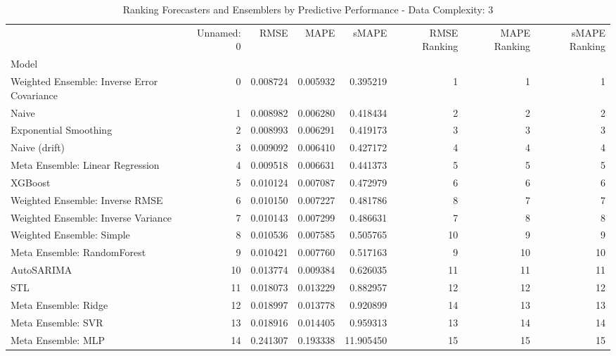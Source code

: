 \begin{table}
\caption{Ranking Forecasters and Ensemblers by Predictive Performance - Data Complexity: 3}
\begin{tabular}{lrrrrrrr}
\toprule
 & Unnamed: 0 & RMSE & MAPE & sMAPE & RMSE Ranking & MAPE Ranking & sMAPE Ranking \\
Model &  &  &  &  &  &  &  \\
\midrule
Weighted Ensemble: Inverse Error Covariance & 0 & 0.008724 & 0.005932 & 0.395219 & 1 & 1 & 1 \\
Naive & 1 & 0.008982 & 0.006280 & 0.418434 & 2 & 2 & 2 \\
Exponential Smoothing & 2 & 0.008993 & 0.006291 & 0.419173 & 3 & 3 & 3 \\
Naive (drift) & 3 & 0.009092 & 0.006410 & 0.427172 & 4 & 4 & 4 \\
Meta Ensemble: Linear Regression & 4 & 0.009518 & 0.006631 & 0.441373 & 5 & 5 & 5 \\
XGBoost & 5 & 0.010124 & 0.007087 & 0.472979 & 6 & 6 & 6 \\
Weighted Ensemble: Inverse RMSE & 6 & 0.010150 & 0.007227 & 0.481786 & 8 & 7 & 7 \\
Weighted Ensemble: Inverse Variance & 7 & 0.010143 & 0.007299 & 0.486631 & 7 & 8 & 8 \\
Weighted Ensemble: Simple & 8 & 0.010536 & 0.007585 & 0.505765 & 10 & 9 & 9 \\
Meta Ensemble: RandomForest & 9 & 0.010421 & 0.007760 & 0.517163 & 9 & 10 & 10 \\
AutoSARIMA & 10 & 0.013774 & 0.009384 & 0.626035 & 11 & 11 & 11 \\
STL & 11 & 0.018073 & 0.013229 & 0.882957 & 12 & 12 & 12 \\
Meta Ensemble: Ridge & 12 & 0.018997 & 0.013778 & 0.920899 & 14 & 13 & 13 \\
Meta Ensemble: SVR & 13 & 0.018916 & 0.014405 & 0.959313 & 13 & 14 & 14 \\
Meta Ensemble: MLP & 14 & 0.241307 & 0.193338 & 11.905450 & 15 & 15 & 15 \\
\bottomrule
\end{tabular}
\end{table}
